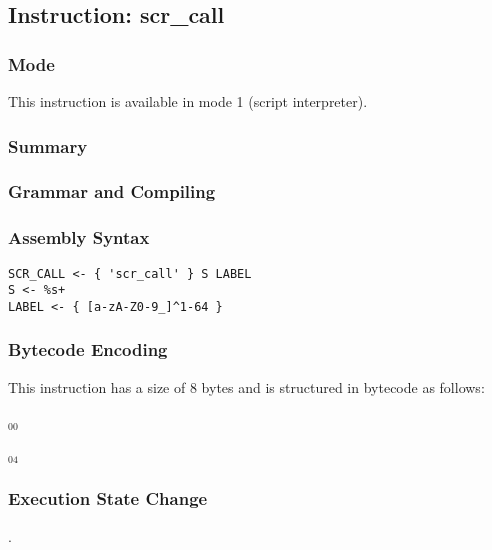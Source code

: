 \subsection{Instruction: scr\_call}

\subsubsection{Mode}
This instruction is available in mode 1 (script interpreter).
\subsubsection{Summary}


\subsubsection{Grammar and Compiling}


\subsubsection{Assembly Syntax}

\begin{myquote}
\begin{verbatim}
SCR_CALL <- { 'scr_call' } S LABEL
S <- %s+
LABEL <- { [a-zA-Z0-9_]^1-64 }
\end{verbatim}
\end{myquote}

\subsubsection{Bytecode Encoding}

This instruction has a size of 8 bytes and is structured in bytecode as follows:

$_{00}$\ 



$_{04}$\ 

\subsubsection{Execution State Change}

.



